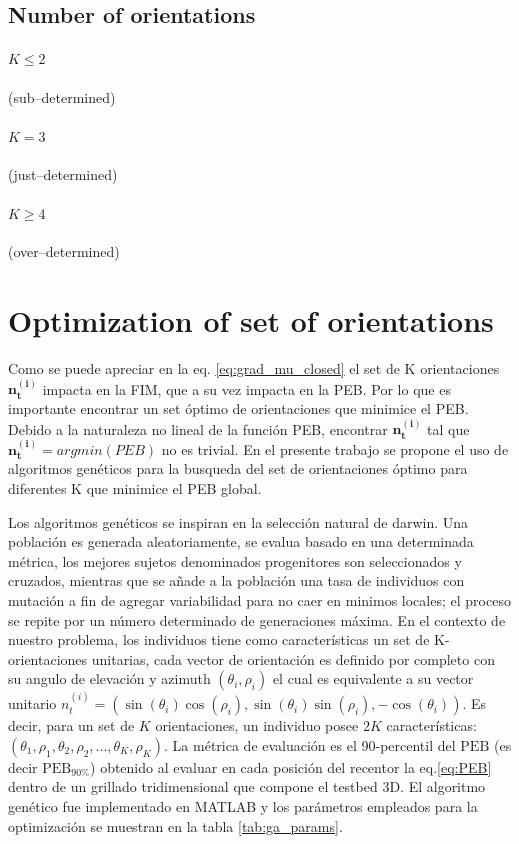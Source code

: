 \documentclass[lettersize,journal]{IEEEtran}
\begin{document}
\subsection{Number of orientations}

\paragraph{$K\le2$ } (sub–determined)
\paragraph{$K=3$ } (just–determined)
\paragraph{$K\ge 4$ } (over–determined)



\section{Optimization of set of orientations}
\label{sec:optimization}
Como se puede apreciar en la eq. \ref{eq:grad_mu_closed} el set de K orientaciones $\mathbf{n_t^{(i)}}$ impacta en la FIM, que a su vez impacta en la PEB. Por lo que es importante encontrar un set óptimo de orientaciones que minimice el PEB. Debido a la naturaleza no lineal de la función PEB, encontrar $\mathbf{n_t^{(i)}}$ tal que $\mathbf{n_t^{(i)}}=argmin(PEB)$ no es trivial. En el presente trabajo se propone el uso de algoritmos genéticos para la busqueda del set de orientaciones óptimo para diferentes K que minimice el PEB global.

Los algoritmos genéticos se inspiran en la selección natural de darwin. Una población es generada aleatoriamente, se evalua basado en una determinada métrica, los mejores sujetos denominados progenitores son seleccionados y cruzados, mientras que se añade a la población una tasa de individuos con mutación a fin de agregar variabilidad para no caer en minimos locales; el proceso se repite por un número determinado de generaciones máxima. En el contexto de nuestro problema, los individuos tiene como características un set de K-orientaciones unitarias, cada vector de orientación es definido por completo con su angulo de elevación y azimuth $(\theta_i,\rho_i)$ el cual es equivalente a su vector unitario $n_t^{(i)}=(\sin(\theta_i)\cos(\rho_i),\sin(\theta_i)\sin(\rho_i),-\cos(\theta_i))$. Es decir, para un set de $K$ orientaciones, un individuo posee $2K$ características: $(\theta_1,\rho_1,\theta_2,\rho_2,...,\theta_K,\rho_K)$. La métrica de evaluación es el 90-percentil del $\mathrm{PEB}$ (es decir  $\mathrm{PEB_{90\%}}$) obtenido al evaluar en cada posición del recentor la eq.\ref{eq:PEB} dentro de un grillado tridimensional que compone el testbed 3D. El algoritmo genético fue implementado en MATLAB y los parámetros empleados para la optimización se muestran en la tabla \ref{tab:ga_params}.
\end{document}
